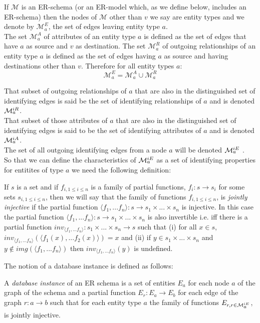 \documentclass[10pt,a4paper]{article}
\newcommand{\term}[1]{\textit{{#1}}}
\newcommand{\genericmodel}{\mathcal{M}}
\newcommand{\allEdges}{\genericmodel^E}
\newcommand{\allAttrs}{\genericmodel^A}
\newcommand{\allRels}{\genericmodel^R}
\newcommand{\edges}[1]{\allEdges_{#1}}
\newcommand{\attrs}[1]{\allAttrs_{#1}}
\newcommand{\rels}[1]{\allRels_{#1}}
\newcommand{\allIdentifying}{\genericmodel^{iE}}
\newcommand{\allIdAttrs}{\genericmodel^{iA}}
\newcommand{\allIdRels}{\genericmodel^{iR}}
\newcommand{\idEdges}[1]{\allIdentifying_{\raisebox{2pt}{$\scriptstyle{#1}$}}}
\newcommand{\idAttrs}[1]{\allIdAttrs_{\raisebox{2pt}{$\scriptstyle{#1}$}}}
\newcommand{\idRels}[1]{\allIdRels_{\raisebox{2pt}{$\scriptstyle{#1}$}}}
\newcommand{\Vtype}{v}
\begin{document}
\noindent If $\genericmodel$ is an ER-schema (or an ER-model which, as we define below, 
includes an ER-schema) then the nodes of $\genericmodel$ other than $\Vtype$ we say are entity types and we denote by $\edges{a}$, the set of edges leaving entity type $a$. \\

\noindent
The set $\attrs{a}$ of attributes of an entity type $a$ is defined as the set of edges that have $a$ as source and  $\Vtype$ as destination. The set $\rels{a}$ of outgoing relationships of an entity type $a$ is defined as the set of edges having $a$ as source and having destinations other than $\Vtype$.
\noindent Therefore for all entity types $a$:
$$
\edges{a} = \attrs{a} \cup \rels{a}
$$

\noindent That subset of outgoing relationships of $a$ that are also in the distinguished set of identifying edges is said 
be the set of identifying relationships of $a$ and is  denoted $\idRels{a}$. \\

\noindent That subset of those attributes of $a$ that are also in the distinguished set of identifying edges is said 
to be the set of identifying attributes of $a$  and is denoted $\idAttrs{a}$.\\

\noindent The set of all outgoing identifying edges from a node $a$ will be denoted $\idEdges{a}$ . \\

\noindent So that we can define the characteristics of $\idEdges{a}$ as a set of identifying properties for entitites of type
$a$ we need the following definition:

\begin{definition}
If $s$ is a set and if $f_{i, 1\leq i \leq n}$ is a family of partial functions, $f_i: s \rightarrow s_i$   for some sets $s_{i, 1 \leq i \leq n}$,  then
we will say that the family of functions $f_{i, 1\leq i \leq n}$, is \term{jointly injective} if the partial function $\langle f_1,...f_n\rangle: s \rightarrow
s_1 \times ... \times s_n $ is injective. In this case the partial function $\langle f_1,...f_n\rangle: s \rightarrow
s_1 \times ... \times s_n $ is also invertible i.e. iff there is a partial function $inv_{\langle f_1,...f_n\rangle} : s_1 \times ... \times s_n \rightarrow s$ such that
(i) for all $x \in s$, $inv_{\langle f_1,...f_n\rangle}(\langle f_1(x),...f_2(x) \rangle ) = x$ and (ii) if $y \in s_1 \times ... \times s_n $ and
$y \notin img(\langle f_1,...f_n\rangle)$ then $inv_{\langle f_1,...f_n\rangle}(y)$ is undefined. \\
\end{definition}
\noindent The notion of a database instance is defined as follows:
\begin{definition}
\noindent A \term{database instance}  of an ER schema is
a set of entities $E_a$ for each node $a$ of the graph of the schema and 
a partial function $E_r : E_a \rightarrow E_b$ for each edge of the graph $r:a \rightarrow b$ such that 
for each entity type $a$ the family of functions $E_{r, r \in \idEdges{a}}$, is jointly injective. 
\end{definition}
\end{document}
